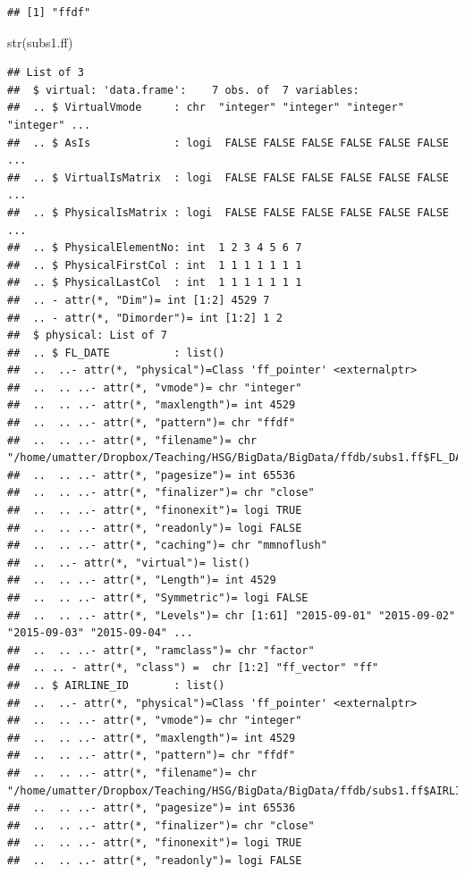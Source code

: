 \documentclass[
  12pt,
]{style/krantz}
\newenvironment{Shaded}{\begin{snugshade}}{\end{snugshade}}
\newcommand{\FunctionTok}[1]{\textcolor[rgb]{0.00,0.00,0.00}{#1}}
\newcommand{\NormalTok}[1]{#1}
\begin{document}
\begin{verbatim}
## [1] "ffdf"
\end{verbatim}

\begin{Shaded}
\begin{Highlighting}[]
\FunctionTok{str}\NormalTok{(subs1.ff)}
\end{Highlighting}
\end{Shaded}

\begin{verbatim}
## List of 3
##  $ virtual: 'data.frame':    7 obs. of  7 variables:
##  .. $ VirtualVmode     : chr  "integer" "integer" "integer" "integer" ...
##  .. $ AsIs             : logi  FALSE FALSE FALSE FALSE FALSE FALSE ...
##  .. $ VirtualIsMatrix  : logi  FALSE FALSE FALSE FALSE FALSE FALSE ...
##  .. $ PhysicalIsMatrix : logi  FALSE FALSE FALSE FALSE FALSE FALSE ...
##  .. $ PhysicalElementNo: int  1 2 3 4 5 6 7
##  .. $ PhysicalFirstCol : int  1 1 1 1 1 1 1
##  .. $ PhysicalLastCol  : int  1 1 1 1 1 1 1
##  .. - attr(*, "Dim")= int [1:2] 4529 7
##  .. - attr(*, "Dimorder")= int [1:2] 1 2
##  $ physical: List of 7
##  .. $ FL_DATE          : list()
##  ..  ..- attr(*, "physical")=Class 'ff_pointer' <externalptr> 
##  ..  .. ..- attr(*, "vmode")= chr "integer"
##  ..  .. ..- attr(*, "maxlength")= int 4529
##  ..  .. ..- attr(*, "pattern")= chr "ffdf"
##  ..  .. ..- attr(*, "filename")= chr "/home/umatter/Dropbox/Teaching/HSG/BigData/BigData/ffdb/subs1.ff$FL_DATE.ff"
##  ..  .. ..- attr(*, "pagesize")= int 65536
##  ..  .. ..- attr(*, "finalizer")= chr "close"
##  ..  .. ..- attr(*, "finonexit")= logi TRUE
##  ..  .. ..- attr(*, "readonly")= logi FALSE
##  ..  .. ..- attr(*, "caching")= chr "mmnoflush"
##  ..  ..- attr(*, "virtual")= list()
##  ..  .. ..- attr(*, "Length")= int 4529
##  ..  .. ..- attr(*, "Symmetric")= logi FALSE
##  ..  .. ..- attr(*, "Levels")= chr [1:61] "2015-09-01" "2015-09-02" "2015-09-03" "2015-09-04" ...
##  ..  .. ..- attr(*, "ramclass")= chr "factor"
##  .. .. - attr(*, "class") =  chr [1:2] "ff_vector" "ff"
##  .. $ AIRLINE_ID       : list()
##  ..  ..- attr(*, "physical")=Class 'ff_pointer' <externalptr> 
##  ..  .. ..- attr(*, "vmode")= chr "integer"
##  ..  .. ..- attr(*, "maxlength")= int 4529
##  ..  .. ..- attr(*, "pattern")= chr "ffdf"
##  ..  .. ..- attr(*, "filename")= chr "/home/umatter/Dropbox/Teaching/HSG/BigData/BigData/ffdb/subs1.ff$AIRLINE_ID.ff"
##  ..  .. ..- attr(*, "pagesize")= int 65536
##  ..  .. ..- attr(*, "finalizer")= chr "close"
##  ..  .. ..- attr(*, "finonexit")= logi TRUE
##  ..  .. ..- attr(*, "readonly")= logi FALSE

\end{verbatim}
\end{document}
